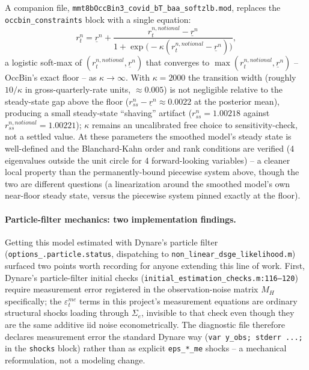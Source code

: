 \documentclass[11pt]{article}
\begin{document}
A companion file, \texttt{mmt8bOccBin3\_covid\_bT\_baa\_softzlb.mod},
replaces the \texttt{occbin\_constraints} block with a single equation:
\[
r^n_t = \underline{r}^n + \frac{r^{n,notional}_t-\underline{r}^n}
{1+\exp\!\big(-\kappa(r^{n,notional}_t-\underline{r}^n)\big)},
\]
a logistic soft-max of $(r^{n,notional}_t,\underline{r}^n)$ that converges
to $\max(r^{n,notional}_t,\underline{r}^n)$ -- OccBin's exact floor -- as
$\kappa\to\infty$. With $\kappa=2000$ the transition width (roughly
$10/\kappa$ in gross-quarterly-rate units, $\approx0.005$) is not
negligible relative to the steady-state gap above the floor
($r^n_{ss}-\underline{r}^n\approx0.0022$ at the posterior mean), producing
a small steady-state ``shaving'' artifact ($r^n_{ss}=1.00218$ against
$r^{n,notional}_{ss}=1.00221$); $\kappa$ remains an uncalibrated free
choice to sensitivity-check, not a settled value. At these parameters the
smoothed model's steady state is well-defined and the Blanchard-Kahn order
and rank conditions are verified (4 eigenvalues outside the unit circle
for 4 forward-looking variables) -- a cleaner local property than the
permanently-bound piecewise system above, though the two are different
questions (a linearization around the smoothed model's own near-floor
steady state, versus the piecewise system pinned exactly at the floor).

\paragraph{Particle-filter mechanics: two implementation findings.}
Getting this model estimated with Dynare's particle filter
(\texttt{options\_.particle.status}, dispatching to
\texttt{non\_linear\_dsge\_likelihood.m}) surfaced two points worth
recording for anyone extending this line of work. First, Dynare's
particle-filter initial checks
(\texttt{initial\_estimation\_checks.m:116--120}) require measurement
error registered in the observation-noise matrix $M_H$ specifically; the
$\varepsilon^{me}_t$ terms in this project's measurement equations are
ordinary structural shocks loading through $\Sigma_e$, invisible to that
check even though they are the same additive iid noise econometrically.
The diagnostic file therefore declares measurement error the standard
Dynare way (\texttt{var y\_obs; stderr ...;} in the \texttt{shocks} block)
rather than as explicit \texttt{eps\_*\_me} shocks -- a mechanical
reformulation, not a modeling change.
\end{document}
